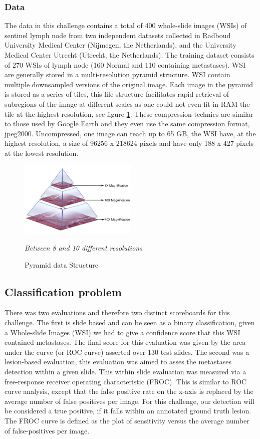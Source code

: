 \documentclass[a4paper,10pt]{article}
\begin{document}
\subsubsection*{Data}
The data in this challenge contains a total of 400 whole-slide images (WSIs) of sentinel lymph node from two independent datasets collected in Radboud University Medical Center (Nijmegen, the Netherlands), and the University Medical Center Utrecht (Utrecht, the Netherlands). The training dataset consists of 270 WSIs of lymph node (160 Normal and 110 containing metastases). WSI are generally stored in a multi-resolution pyramid structure. WSI contain multiple downsampled versions of the original image. Each image in the pyramid is stored as a series of tiles, this file structure facilitates rapid retrieval of subregions of the image at different scales as one could not even fit in RAM the tile at the highest resolution, see figure \ref{fig: Pyramid}. These compression technics are similar to those used by Google Earth and they even use the same compression format, jpeg2000. Uncompressed, one image can reach up to 65 GB, the WSI have, at the highest resolution, a size of 96256 x 218624 pixels and have only 188 x 427 pixels at the lowest resolution.


\begin{figure}[!ht]
\centering
\includegraphics[width=0.5\textwidth]{pyramid.png}
\caption{Pyramid data Structure}
\textit{Between 8 and 10 different resolutions}
\label{fig: Pyramid}
\end{figure}


\subsection{Classification problem}
There was two evaluations and therefore two distinct scoreboards for this challenge. The first is slide based and can be seen as a binary classification, given a Whole-slide Images (WSI) we had to give a confidence score that this WSI contained metastases. The final score for this evaluation was given by the area under the curve (or ROC curve) asserted over 130 test slides. The second was a lesion-based evaluation, this evaluation was aimed to asses the metastases detection within a given slide. This within slide evaluation was measured via a free-response receiver operating characteristic (FROC). This is similar to ROC curve analysis, except that the false positive rate on the x-axis is replaced by the average number of false positives per image. For this challenge, our detection will be considered a true positive, if it falls within an annotated ground truth lesion. The FROC curve is defined as the plot of sensitivity versus the average number of false-positives per image. 
\end{document}
